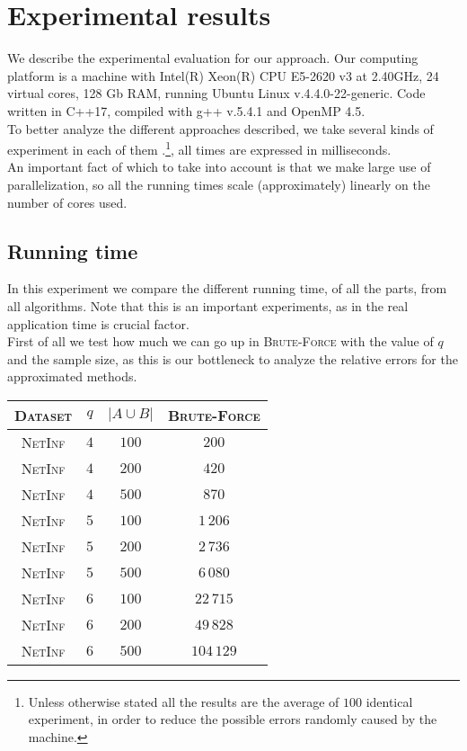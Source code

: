     \section{Experimental results}

    We describe the experimental evaluation for our approach. Our computing platform is a machine with Intel(R) Xeon(R) CPU E5-2620 v3 at 2.40GHz, 24 virtual cores, 128 Gb RAM, running Ubuntu Linux v.4.4.0-22-generic. Code written in C++17, compiled with g++ v.5.4.1 and OpenMP 4.5.\\
    
    To better analyze the different approaches described, we take several kinds of experiment in each of them .\footnote{Unless otherwise stated all the results are the average of $100$ identical experiment, in order to reduce the possible errors randomly caused by the machine.}, all times are expressed in milliseconds.\\
     
    An important fact of which to take into account is that we make large use of parallelization, 
    so all the running times scale (approximately) linearly on the number of cores used.
    
	\subsection*{Running time}
	
	In this experiment we compare the different running time, of all the parts, from all algorithms. Note that this is an important experiments, as in the real application time is crucial factor.\\

	First of all we test how much we can go up in \textsc{Brute-Force} with the value of $q$ and the sample size, as this is our bottleneck to analyze the relative errors for the approximated methods.\\ 
	
	\begin{table}[h]
		\centering
		\label{my-label}
		\begin{tabular}{|c|c|c|c|}
			\hline
			\textsc{Dataset} & $q$ & $|A \cup B|$ & \textsc{Brute-Force} \\ \hline
			\textsc{NetInf}  & $4$ & $100$        & $200$ \\ \hline
			\textsc{NetInf}  & $4$ & $200$        & $420$ \\ \hline
			\textsc{NetInf}  & $4$ & $500$        & $870$ \\ \hline
			\textsc{NetInf}  & $5$ & $100$        & $1\,206$ \\ \hline
			\textsc{NetInf}  & $5$ & $200$        & $2\,736$ \\ \hline
			\textsc{NetInf}  & $5$ & $500$        & $6\,080$ \\ \hline
			\textsc{NetInf}  & $6$ & $100$        & $22\,715$ \\ \hline
			\textsc{NetInf}  & $6$ & $200$        & $49\,828$ \\ \hline
			\textsc{NetInf}  & $6$ & $500$        & $104\,129$ \\ \hline
		\end{tabular}
	\end{table}


